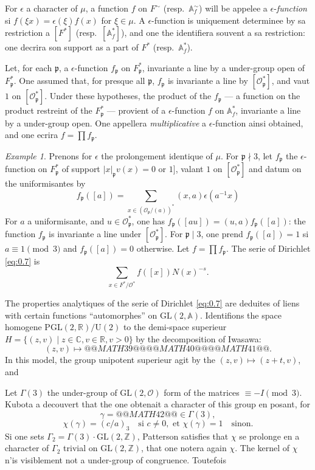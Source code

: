 \documentclass[12pt,a4paper]{article}
\theoremstyle{plain}
\theoremstyle{definition}
\theoremstyle{remark}
\newtheorem{example}[theorem]{Example}
\newcommand{\CC}{\mathbb{C}}
\newcommand{\RR}{\mathbb{R}}
\newcommand{\ZZ}{\mathbb{Z}}
\newcommand{\Af}{\mathbb{A}}
\newcommand{\cO}{\mathcal{O}}
\newcommand{\frakp}{\mathfrak{p}}
\providecommand{\CC}{\mathbb{C}}
\providecommand{\RR}{\mathbb{R}}
\providecommand{\ZZ}{\mathbb{Z}}
\providecommand{\cO}{\mathcal{O}}
\providecommand{\frakp}{\mathfrak{p}}
\begin{document}
For $\epsilon$ a character of $\mu$, a function $f$ on $F^\sim$ (resp.\ $\Af_f^\sim$) will be appelee a $\epsilon$-\emph{function} si $f(\xi x) = \epsilon(\xi) f(x)$ for $\xi \in \mu$. A $\epsilon$-function is uniquement determinee by sa restriction a $[F^*]$ (resp.\ $[\Af_f^*]$), and one the identifiera souvent a sa restriction: one decrira son support as a part of $F^*$ (resp.\ $\Af_f^*$).

Let, for each $\frakp$, a $\epsilon$-function $f_\frakp$ on $F_\frakp^*$, invariante a line by a under-group open of $F_\frakp^*$. One assumed that, for presque all $\frakp$, $f_\frakp$ is invariante a line by $[\cO_\frakp^*]$, and vaut $1$ on $[\cO_\frakp^*]$. Under these hypotheses, the product of the $f_\frakp$ --- a function on the product restreint of the $F_\frakp^*$ --- provient of a $\epsilon$-function $f$ on $\Af_f^*$, invariante a line by a under-group open. One appellera \emph{multiplicative} a $\epsilon$-function ainsi obtained, and one ecrira $f = \prod f_\frakp$.

\begin{example}
Prenons for $\epsilon$ the prolongement identique of $\mu$. For $\frakp \nmid 3$, let $f_\frakp$ the $\epsilon$-function on $F_\frakp^*$ of support $|x|_\frakp v(x) = 0$ or $1]$, valant $1$ on $[\cO_\frakp^*]$ and datum on the uniformisantes by
\[
f_\frakp([a]) = \sum_{x \in (\cO_\frakp/(a))^*} (x, a) \epsilon(a^{-1} x)
\]
For $a$ a uniformisante, and $u \in \cO_\frakp^*$, one has $f_\frakp([au]) = (u, a) f_\frakp([a])$: the function $f_\frakp$ is invariante a line under $[\cO_\frakp^*]$. For $\frakp \mid 3$, one prend $f_\frakp([a]) = 1$ si $a \equiv 1 \pmod 3$ and $f_\frakp([a]) = 0$ otherwise. Let $f = \prod f_\frakp$. The serie of Dirichlet \eqref{eq:0.7} is
\[
\sum_{x \in F^* / \cO^*} f([x]) N(x)^{-s}.
\]
\end{example}

The properties analytiques of the serie of Dirichlet \eqref{eq:0.7} are deduites of liens with certain functions ``automorphes'' on $\mathrm{GL}(2, \Af)$. Identifions the space homogene $\mathrm{PGL}(2, \RR) / \mathrm{U}(2)$ to the demi-space superieur $H = \{(z, v) \mid z \in \CC, v \in \RR, v > 0\}$ by the decomposition of Iwasawa:
\[
(z, v) \longmapsto @@MATH39@@ @@MATH40@@ @@MATH41@@.
\]
In this model, the group unipotent superieur agit by the $(z, v) \mapsto (z + t, v)$, and

\medskip

Let $\Gamma(3)$ the under-group of $\mathrm{GL}(2, \cO)$ form of the matrices $\equiv -I \pmod 3$. Kubota a decouvert that the one obtenait a character of this group en posant, for
\[
\gamma = @@MATH42@@ \in \Gamma(3),
\]
\[
\chi(\gamma) = (c/a)_3 \quad \text{si } c \neq 0, \text{ et } \chi(\gamma) = 1 \quad \text{sinon}.
\]
Si one sets $\Gamma_2 = \Gamma(3) \cdot \mathrm{GL}(2, \ZZ)$, Patterson satisfies that $\chi$ se prolonge en a character of $\Gamma_2$ trivial on $\mathrm{GL}(2, \ZZ)$, that one notera again $\chi$. The kernel of $\chi$ n'is visiblement not a under-group of congruence. Toutefois
\end{document}
